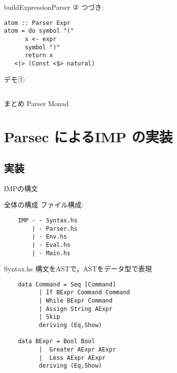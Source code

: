 \documentclass[uplatex,dvipdfmx,ja=standard]{beamer}
\begin{document}
\begin{frame}[fragile]{buildExpressionParser ②}
    つづき:
    \begin{verbatim}
atom :: Parser Expr
atom = do symbol "("
      x <- expr
      symbol ")"
      return x
   <|> (Const <$> natural)
    \end{verbatim}
\end{frame}

\begin{frame}{デモ①}
\end{frame}

\subsection{}

\begin{frame}{まとめ}
    Parser Monad
\end{frame}

\section{Parsec によるIMP の実装}
\subsection{実装}

\begin{frame}[fragile]{IMPの構文}
\end{frame}

\begin{frame}[fragile]{全体の構成}
    ファイル構成:
    \begin{verbatim}
    IMP - - Syntax.hs
        | - Parser.hs 
        | - Env.hs
        | - Eval.hs
        | - Main.hs
    \end{verbatim}
\end{frame}

\begin{frame}[fragile]{Syntax.hs}
    構文をASTで，ASTをデータ型で表現
    \begin{verbatim}
    data Command = Seq [Command]
          | If BExpr Command Command
          | While BExpr Command 
          | Assign String AExpr
          | Skip
          deriving (Eq,Show)

    data BExpr = Bool Bool
          |  Greater AExpr AExpr
          |  Less AExpr AExpr
          deriving (Eq,Show)
    \end{verbatim}
\end{frame}
\end{document}
